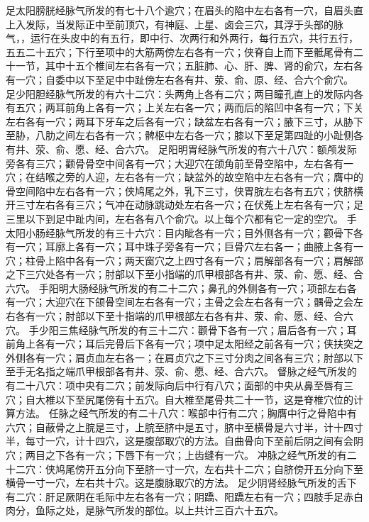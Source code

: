 \documentclass[12pt,UTF8]{ctexbook}
\begin{document}
足太阳膀胱经脉气所发的有七十八个逾穴；在眉头的陷中左右各有一穴，自眉头直上入发际，当发际正中至前顶穴，有神庭、上星、卤会三穴，其浮于头部的脉气，，运行在头皮中的有五行，即中行、次两行和外两行，每行五穴，共行五行，五五二十五穴；下行至项中的大筋两傍左右各有一穴；侠脊自上而下至骶尾骨有二十一节，其中十五个椎间左右各有一穴；五脏肺、心、肝、脾、肾的俞穴，左右各有一穴；自委中以下至足中中趾傍左右各有井、荥、俞、原、经、合六个俞穴。
足少阳胆经脉气所发的有六十二穴：头两角上各有二穴；两目瞳孔直上的发际内各有五穴；两耳前角上各有一穴；上关左右各一穴；两而后的陷凹中各有一穴；下关左右各有一穴；两耳下牙车之后各有一穴；缺盆左右各有一穴；腋下三寸，从胁下至胁，八肋之间左右各有一穴；髀枢中左右各一穴；膝以下至足第四趾的小趾侧各有井、荥、俞、愿、经、合六穴。
足阳明胃经脉气所发的有六十八穴：额颅发际旁各有三穴；颧骨骨空中间各有一穴；大迎穴在颌角前至骨空陷中，左右各有一穴；在结喉之旁的人迎，左右各有一穴；缺盆外的故空陷中左右各有一穴；膺中的骨空间陷中左右各有一穴；侠鸠尾之外，乳下三寸，侠胃脘左右各有五穴；侠脐横开三寸左右各有三穴；气冲在动脉跳动处左右各一穴；在伏菟上左右各有一穴；足三里以下到足中趾内间，左右各有八个俞穴。以上每个穴都有它一定的空穴。
手太阳小肠经脉气所发的有三十六穴：目内眦各有一穴；目外侧各有一穴；颧骨下各有一穴；耳廓上各有一穴；耳中珠子旁各有一穴；巨骨穴左右各一；曲腋上各有一穴；柱骨上陷中各有一穴；两天窗穴之上四寸各有一穴；肩解部各有一穴；肩解部之下三穴处各有一穴；肘部以下至小指端的爪甲根部各有井、荥、俞、愿、经、合六穴。
手阳明大肠经脉气所发的有二十二穴；鼻孔的外侧各有一穴；项部左右各有一穴；大迎穴在下颌骨空间左右各有一穴；主骨之会左右各有一穴；髃骨之会左右各有一穴；肘部以下至十指端的爪甲根部左右各有井、荥、俞、愿、经、合六穴。
手少阳三焦经脉气所发的有三十二穴：颧骨下各有一穴；眉后各有一穴；耳前角上各有一穴；耳后完骨后下各有一穴；项中足太阳经之前各有一穴；侠扶突之外侧各有一穴；肩贞血左右各一；在肩贞穴之下三寸分肉之间各有三穴；肘部以下至手无名指之端爪甲根部各有井、荥、俞、愿、经、合六穴。
督脉之经气所发的有二十八穴：项中央有二穴；前发际向后中行有八穴；面部的中央从鼻至唇有三穴；自大椎以下至尻尾傍有十五穴。自大椎至尾骨共二十一节，这是脊椎穴位的计算方法。
任脉之经气所发的有二十八穴：喉部中行有二穴；胸膺中行之骨陷中有六穴；自蔽骨之上脘是三寸，上脘至脐中是五寸，脐中至横骨是六寸半，计十四寸半，每寸一穴，计十四穴，这是腹部取穴的方法。自曲骨向下至前后阴之间有会阴穴；两目之下各有一穴；下唇下有一穴；上齿缝有一穴。
冲脉之经气所发的有二十二穴：侠鸠尾傍开五分向下至脐一寸一穴，左右共十二穴；自脐傍开五分向下至横骨一寸一穴，左右共十穴。这是腹脉取穴的方法。
足少阴肾经脉气所发的舌下有二穴：肝足厥阴在毛际中左右各有一穴；阴蹻、阳蹻左右有一穴；四肢手足赤白肉分，鱼际之处，是脉气所发的部位。以上共计三百六十五穴。
\end{document}
